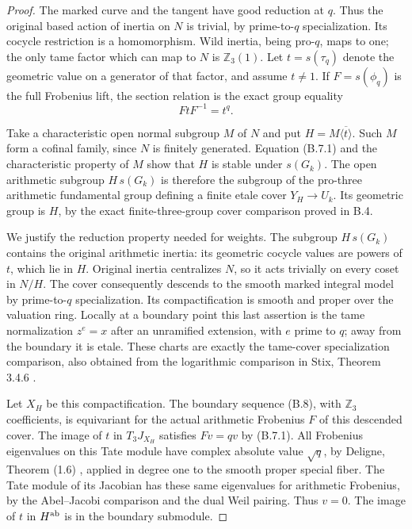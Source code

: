 \begin{proof}
The marked curve and the tangent have good reduction at $q$.
Thus the original based action of inertia on $N$ is trivial,
by prime-to-$q$ specialization.  Its cocycle restriction is
a homomorphism.  Wild inertia, being pro-$q$, maps to one;
the only tame factor which can map to $N$ is $\mathbb Z_3(1)$.
Let $t=s(\tau_q)$ denote the geometric value on a generator
of that factor, and assume $t\ne1$.  If
$F=s(\phi_q)$ is the full Frobenius lift, the section relation
is the exact group equality
\[
                         FtF^{-1}=t^q.                      \tag{B.7.1}
\]

Take a characteristic open normal subgroup $M$ of $N$ and put
$H=M\overline{\langle t\rangle}$.  Such $M$ form a cofinal
family, since $N$ is finitely generated.  Equation (B.7.1)
and the characteristic property of $M$ show that $H$ is
stable under $s(G_k)$.  The open arithmetic subgroup
$H\,s(G_k)$ is therefore the subgroup of the pro-three
arithmetic fundamental group defining a finite etale cover
$Y_H\to U_k$.  Its geometric group is $H$, by the exact
finite-three-group cover comparison proved in B.4.

We justify the reduction property needed for weights.
The subgroup $H\,s(G_k)$ contains the original arithmetic
inertia: its geometric cocycle values are powers of $t$,
which lie in $H$.  Original inertia centralizes $N$, so it
acts trivially on every coset in $N/H$.
The cover consequently descends to the smooth marked
integral model by prime-to-$q$ specialization.  Its
compactification is smooth and proper over the valuation
ring.  Locally at a boundary point this last assertion is
the tame normalization $z^e=x$ after an unramified extension,
with $e$ prime to $q$; away from the boundary it is etale.
These charts are exactly the tame-cover specialization
comparison, also obtained from the logarithmic comparison
in Stix, Theorem 3.4.6 \cite{BC_Stix2002}.

Let $X_H$ be this compactification.  The boundary sequence
(B.8), with $\mathbb Z_3$ coefficients, is equivariant for
the actual arithmetic Frobenius $F$ of this descended cover.
The image of $t$ in $T_3J_{X_H}$ satisfies $Fv=qv$ by
(B.7.1).  All Frobenius eigenvalues on this Tate module
have complex absolute value $\sqrt q$, by Deligne,
Theorem (1.6) \cite{BC_Deligne1974}, applied in degree one
to the smooth proper special fiber.  The Tate module of
its Jacobian has these same eigenvalues for arithmetic
Frobenius, by the Abel--Jacobi comparison and the dual
Weil pairing.  Thus $v=0$.
The image of $t$ in $H^{\rm ab}$ is in the boundary submodule.


\end{proof}
